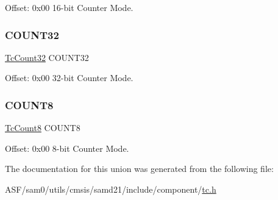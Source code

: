 Offset\+: 0x00 16-\/bit Counter Mode. 

\mbox{\label{union_tc_a2d1c2f02ca49d2a99e8954083cddb9f7}} 
\subsubsection{\texorpdfstring{COUNT32}{COUNT32}}
{\footnotesize\ttfamily \mbox{\hyperlink{struct_tc_count32}{Tc\+Count32}} C\+O\+U\+N\+T32}



Offset\+: 0x00 32-\/bit Counter Mode. 

\mbox{\label{union_tc_a33c60e7050dc98bb9c39fcc85f79b989}} 
\subsubsection{\texorpdfstring{COUNT8}{COUNT8}}
{\footnotesize\ttfamily \mbox{\hyperlink{struct_tc_count8}{Tc\+Count8}} C\+O\+U\+N\+T8}



Offset\+: 0x00 8-\/bit Counter Mode. 



The documentation for this union was generated from the following file\+:\begin{DoxyCompactItemize}
\item 
A\+S\+F/sam0/utils/cmsis/samd21/include/component/\mbox{\hyperlink{utils_2cmsis_2samd21_2include_2component_2tc_8h}{tc.\+h}}\end{DoxyCompactItemize}
